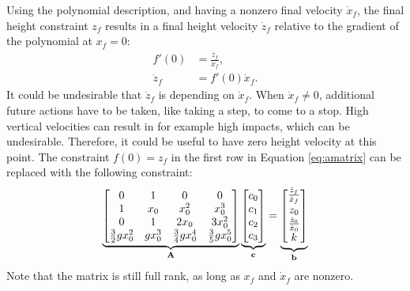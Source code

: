 Using the polynomial description, and having a nonzero final velocity $\dot{x}_f$, the final height constraint $z_f$ results in a final height velocity $\dot{z}_f$ relative to the gradient of the polynomial at $x_f=0$:
\begin{align}
 	f'(0) &= \frac{\dot{z}_f}{\dot{x}_f},\\
 	\dot{z}_f &= f'(0)\dot{x}_f.
\end{align}
It could be undesirable that $\dot{z}_f$ is depending on $\dot{x}_f$. When $\dot{x}_f \neq 0$, additional future actions have to be taken, like taking a step, to come to a stop. High vertical velocities can result in for example high impacts, which can be undesirable. Therefore, it could be useful to have zero height velocity at this point. The constraint $f(0)=z_f$ in the first row in Equation \ref{eq:amatrix} can be replaced with the following constraint:
\begin{equation}
    \underbrace{\begin{bmatrix}0 & 1 & 0 & 0 \\ 
     1 & x_0 & x_0^2 & x_0^3\\
     0 & 1 & 2x_0 & 3x_0^2\\
     \frac{3}{2}gx_0^2 & gx_0^3 & \frac{3}{4}gx_0^4 & \frac{3}{5}gx_0^5\\
     \end{bmatrix}}_{\mathbf{A}}
     \underbrace{\begin{bmatrix}
     c_0\\
     c_1\\
     c_2\\
     c_3\\
     \end{bmatrix}}_{\mathbf{c}}=
     \underbrace{\begin{bmatrix}
    \frac{\dot{z}_f}{\dot{x}_f}\\ 
     z_0\\
     \frac{\dot{z}_0}{\dot{x}_0}\\
     k\\
     \end{bmatrix}}_{\mathbf{b}}
     \label{eq:a1matrix}
\end{equation}
Note that the matrix is still full rank, as long as $x_f$ and $\dot{x}_f$ are nonzero. 

